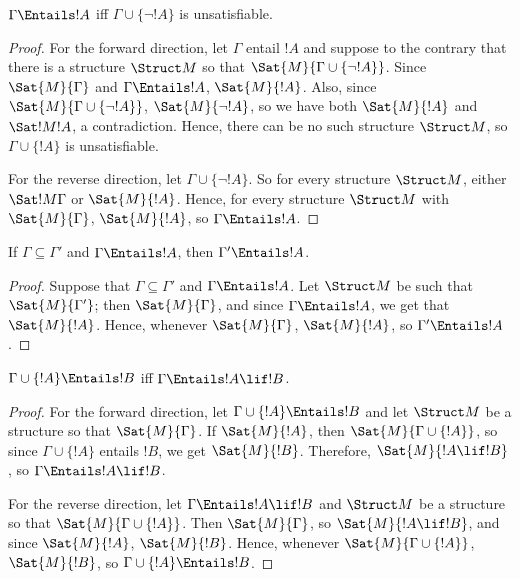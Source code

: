 \documentclass[../../include/open-logic-section]{subfiles}
\begin{document}
\begin{prop}
$\Gamma \Entails !A$ iff $\Gamma \cup \{\lnot !A\}$ is unsatisfiable.
\end{prop}

\begin{proof}
For the forward direction, let $\Gamma$ entail $!A$ and suppose to the
contrary that there is a structure $\Struct M$ so that $\Sat{M}{\Gamma
  \cup \{ \lnot !A \}}$. Since $\Sat{M}{\Gamma}$ and $\Gamma \Entails
!A$, $\Sat{M}{!A}$. Also, since $\Sat{M}{\Gamma\cup \{ \lnot !A \}}$,
$\Sat{M}{\lnot !A}$, so we have both $\Sat{M}{!A}$ and $\Sat!{M}{!A}$,
a contradiction. Hence, there can be no such structure $\Struct M$, so
$\Gamma \cup \{ !A \}$ is unsatisfiable.

For the reverse direction, let $\Gamma \cup \{ \lnot !A \}$. So for
every structure $\Struct M$, either $\Sat!{M}{\Gamma}$ or
$\Sat{M}{!A}$. Hence, for every structure $\Struct M$ with
$\Sat{M}{\Gamma}$, $\Sat{M}{!A}$, so $\Gamma \Entails !A$.
\end{proof}

\begin{prop}
If $\Gamma \subseteq \Gamma'$ and $\Gamma \Entails !A$, then $\Gamma'
\Entails !A$.
\end{prop}

\begin{proof}
Suppose that $\Gamma \subseteq \Gamma'$ and $\Gamma \Entails !A$. Let
$\Struct M$ be such that $\Sat{M}{\Gamma'}$; then $\Sat{M}{\Gamma}$,
and since $\Gamma \Entails !A$, we get that $\Sat{M}{!A}$. Hence,
whenever $\Sat{M}{\Gamma}$, $\Sat{M}{!A}$, so $\Gamma' \Entails !A$.
\end{proof}


\begin{thm}
$\Gamma \cup \{!A\} \Entails !B$ iff $\Gamma \Entails !A \lif !B$.
\end{thm}

\begin{proof}
For the forward direction, let $\Gamma \cup \{ !A \} \Entails !B$ and
let $\Struct M$ be a structure so that $\Sat{M}{\Gamma}$. If
$\Sat{M}{!A}$, then $\Sat{M}{\Gamma \cup \{ !A \} }$, so since $\Gamma
\cup \{ !A \}$ entails $!B$, we get $\Sat{M}{!B}$. Therefore,
$\Sat{M}{!A \lif !B}$, so $\Gamma \Entails !A \lif !B$.

For the reverse direction, let $\Gamma \Entails !A \lif !B$ and
$\Struct M$ be a structure so that $\Sat{M}{\Gamma \cup \{ !A
  \}}$. Then $\Sat{M}{\Gamma}$, so $\Sat{M}{!A \lif !B}$, and since
$\Sat{M}{!A}$, $\Sat{M}{!B}$. Hence, whenever $\Sat{M}{\Gamma \cup \{
  !A \} }$, $\Sat{M}{!B}$, so $\Gamma \cup \{ !A \} \Entails !B$.
\end{proof}
\end{document}
